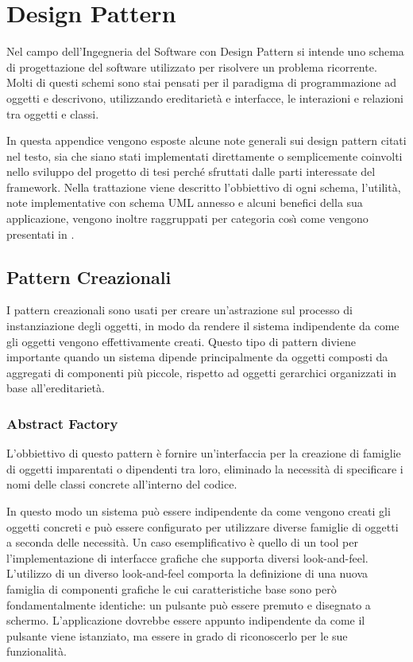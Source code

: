 
\chapter{Design Pattern}
\label{a:designpatterns}
Nel campo dell'Ingegneria del Software con Design Pattern si intende uno schema di progettazione del software utilizzato per risolvere un problema ricorrente.
Molti di questi schemi sono stai pensati per il paradigma di programmazione ad oggetti e descrivono, utilizzando ereditariet\`a e interfacce, le interazioni e relazioni tra oggetti e classi.

In questa appendice vengono esposte alcune note generali sui design pattern citati nel testo, sia che siano stati implementati direttamente o semplicemente coinvolti nello sviluppo del progetto di tesi perch\'e sfruttati dalle parti interessate del framework.
Nella trattazione viene descritto l'obbiettivo di ogni schema, l'utilit\`a, note implementative con schema \ac{UML} annesso e alcuni benefici della sua applicazione, vengono inoltre raggruppati per categoria cos{\`\i} come vengono presentati in \cite{book:designpattern}.

\section{Pattern Creazionali}
I pattern creazionali sono usati per creare un'astrazione sul processo di instanziazione degli oggetti, in modo da rendere il sistema indipendente da come gli oggetti vengono effettivamente creati. Questo tipo di pattern diviene importante quando un sistema dipende principalmente da oggetti composti da aggregati di componenti pi\`u piccole, rispetto ad oggetti gerarchici organizzati in base all'ereditariet\`a.

\subsection{Abstract Factory}
\label{sub:abstractfactory}
L'obbiettivo di questo pattern \`e fornire un'interfaccia per la creazione di famiglie di oggetti imparentati o dipendenti tra loro, eliminado la necessit\`a di specificare i nomi delle classi concrete all'interno del codice.

In questo modo un sistema pu\`o essere indipendente da come vengono creati gli oggetti concreti e pu\`o essere configurato per utilizzare diverse famiglie di oggetti a seconda delle necessit\`a. Un caso esemplificativo \`e quello di un tool per l'implementazione di interfacce grafiche che supporta diversi look-and-feel. L'utilizzo di un diverso look-and-feel comporta la definizione di una nuova famiglia di componenti grafiche le cui caratteristiche base sono per\`o fondamentalmente identiche: un pulsante pu\`o essere premuto e disegnato a schermo. L'applicazione dovrebbe essere appunto indipendente da come il pulsante viene istanziato, ma essere in grado di riconoscerlo per le sue funzionalit\`a.

